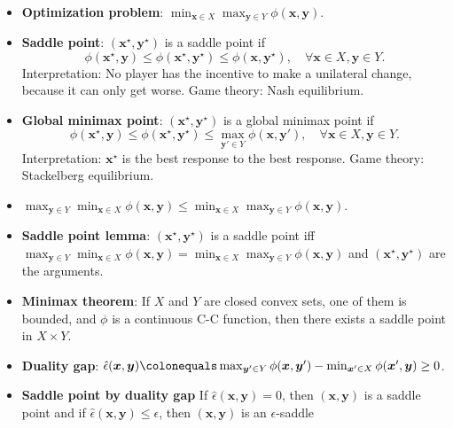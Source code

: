 \documentclass[8pt,a4paper]{extarticle}
\renewcommand{\vec}[1]{\bm{#1}}
\newenvironment{topic}[1]
{\textbf{\sffamily \colorbox{black}{\rlap{\textbf{\textcolor{white}{#1}}}\hspace{\linewidth}\hspace{-2\fboxsep}}} \\ \vspace{0.2cm}}
{}
\begin{document}
\begin{multicols*}{2}
    \begin{topic}{Min-max optimization}
        \begin{itemize}
            \item \textbf{Optimization problem}: $\min_{\vec{x} \in X} \max_{\vec{y} \in Y} \phi(\vec{x}, \vec{y})$.
            \item \textbf{Saddle point}: $(\vec{x}^\star, \vec{y}^\star)$ is a saddle point if \[
                      \phi(\vec{x}^\star, \vec{y}) \leq \phi(\vec{x}^\star, \vec{y}^\star) \leq \phi(\vec{x}, \vec{y}^\star), \quad \forall \vec{x} \in X, \vec{y} \in Y.
                  \]
                  Interpretation: No player has the incentive to make a unilateral change, because it can only get
                  worse. Game theory: Nash equilibrium.
            \item \textbf{Global minimax point}: $(\vec{x}^\star, \vec{y}^\star)$ is a global minimax point if \[
                      \phi(\vec{x}^\star, \vec{y}) \leq \phi(\vec{x}^\star, \vec{y}^\star) \leq \max_{\vec{y}' \in Y} \phi(\vec{x}, \vec{y}'), \quad \forall \vec{x} \in X, \vec{y} \in Y.
                  \]
                  Interpretation: $\vec{x}^\star$ is the best response to the best response. Game theory: Stackelberg
                  equilibrium.
            \item $\max_{\vec{y} \in Y} \min_{\vec{x} \in X} \phi(\vec{x}, \vec{y}) \leq \min_{\vec{x} \in X} \max_{\vec{y} \in Y} \phi(\vec{x}, \vec{y})$.
            \item \textbf{Saddle point lemma}: $(\vec{x}^\star, \vec{y}^\star)$ is a saddle point iff $\max_{\vec{y} \in Y} \min_{\vec{x} \in X} \phi(\vec{x}, \vec{y}) = \min_{\vec{x} \in X} \max_{\vec{y} \in Y} \phi(\vec{x}, \vec{y})$ and $(\vec{x}^\star, \vec{y}^\star)$ are the arguments.
            \item \textbf{Minimax theorem}: If $X$ and $Y$ are closed convex sets, one of them is bounded, and $\phi$ is a continuous C-C function, then there exists a saddle point in $X \times Y$.
            \item \textbf{Duality gap}: $\hat{\epsilon}(\vec{x}, \vec{y}) \colonequals \max_{\vec{y}' \in Y} \phi(\vec{x}, \vec{y}') - \min_{\vec{x}' \in X} \phi(\vec{x}', \vec{y}) \geq 0$.
            \item \textbf{Saddle point by duality gap} If $\hat{\epsilon}(\vec{x}, \vec{y}) = 0$, then $(\vec{x}, \vec{y})$ is a saddle point and if
                  $\hat{\epsilon}(\vec{x}, \vec{y}) \leq \epsilon$, then $(\vec{x}, \vec{y})$ is an $\epsilon$-saddle

\end{itemize}
\end{topic}
\end{multicols*}
\end{document}
